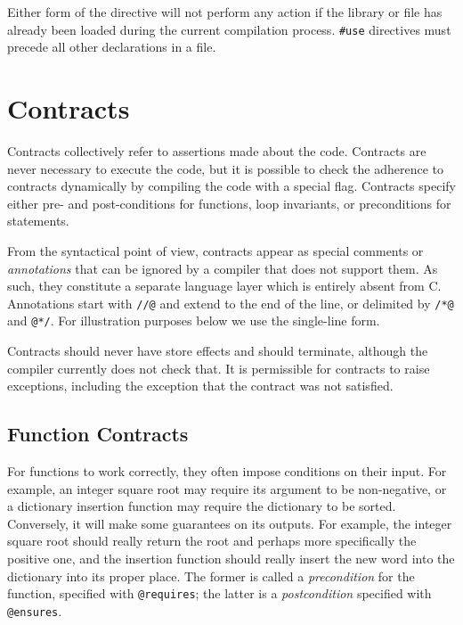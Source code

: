 \documentclass[11pt]{article}
\begin{document}
Either form of the directive will not perform any action if
the library or file has already been loaded during the current
compilation process.  \lstinline'#use' directives must precede all
other declarations in a file.

\section{Contracts}
\label{sec:contracts}

Contracts collectively refer to assertions made about the code.
Contracts are never necessary to execute the code, but it is possible
to check the adherence to contracts dynamically by compiling the code
with a special flag.  Contracts specify either pre- and post-conditions
for functions, loop invariants, or preconditions for statements.

From the syntactical point of view, contracts appear as special
comments or \emph{annotations} that can be ignored by a compiler that
does not support them.  As such, they constitute a separate language
layer which is entirely absent from C\@.  Annotations start with
\lstinline'//@' and extend to the end of the line, or delimited
by \lstinline'/*@' and \lstinline'@*/'.  For illustration purposes below
we use the single-line form.

Contracts should never have store effects and should terminate,
although the compiler currently does not check that.  It is
permissible for contracts to raise exceptions, including the exception
that the contract was not satisfied.

\subsection{Function Contracts}

For functions to work correctly, they often impose conditions on their
input.  For example, an integer square root may require its argument
to be non-negative, or a dictionary insertion function may require
the dictionary to be sorted.  Conversely, it will make some guarantees
on its outputs.  For example, the integer square root should really
return the root and perhaps more specifically the positive one, and
the insertion function should really insert the new word into the
dictionary into its proper place.  The former is called a
\emph{precondition} for the function, specified with \lstinline'@requires';
the latter is a \emph{postcondition} specified with \lstinline'@ensures'.
\end{document}
